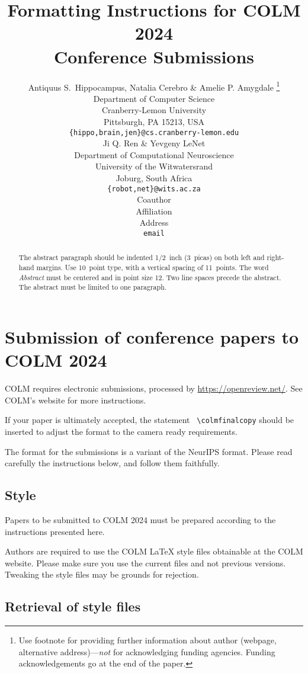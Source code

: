 \documentclass{article} %
\title{Formatting Instructions for COLM 2024 \\ Conference Submissions}
\author{Antiquus S.~Hippocampus, Natalia Cerebro \& Amelie P. Amygdale \thanks{ Use footnote for providing further information
about author (webpage, alternative address)---\emph{not} for acknowledging
funding agencies.  Funding acknowledgements go at the end of the paper.} \\
Department of Computer Science\\
Cranberry-Lemon University\\
Pittsburgh, PA 15213, USA \\
\texttt{\{hippo,brain,jen\}@cs.cranberry-lemon.edu} \\
\And
Ji Q. Ren \& Yevgeny LeNet \\
Department of Computational Neuroscience \\
University of the Witwatersrand \\
Joburg, South Africa \\
\texttt{\{robot,net\}@wits.ac.za} \\
\AND
Coauthor \\
Affiliation \\
Address \\
\texttt{email}
}
\begin{document}
\maketitle

\begin{abstract}
The abstract paragraph should be indented 1/2~inch (3~picas) on both left and
right-hand margins. Use 10~point type, with a vertical spacing of 11~points.
The word \textit{Abstract} must be centered and in point size 12. Two
line spaces precede the abstract. The abstract must be limited to one
paragraph.
\end{abstract}

\section{Submission of conference papers to COLM 2024}

COLM requires electronic submissions, processed by
\url{https://openreview.net/}. See COLM's website for more instructions.

If your paper is ultimately accepted, the statement {\tt
  {\textbackslash}colmfinalcopy} should be inserted to adjust the
format to the camera ready requirements.

The format for the submissions is a variant of the NeurIPS format.
Please read carefully the instructions below, and follow them
faithfully.

\subsection{Style}

Papers to be submitted to COLM 2024 must be prepared according to the
instructions presented here.


Authors are required to use the COLM \LaTeX{} style files obtainable at the
COLM website. Please make sure you use the current files and
not previous versions. Tweaking the style files may be grounds for rejection.

\subsection{Retrieval of style files}
\end{document}
